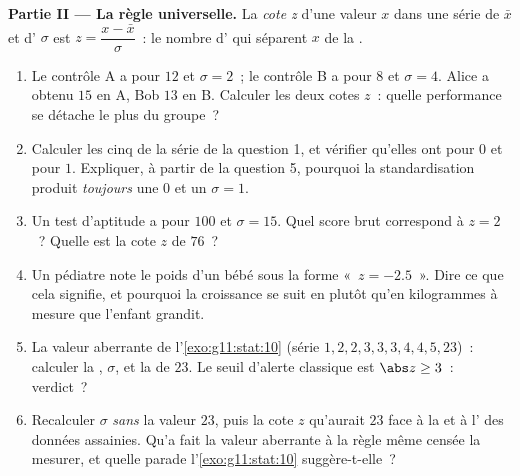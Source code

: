 \begin{problem}
\medskip
\noindent\textbf{Partie II --- La règle universelle.}
La \emph{cote z} d'une valeur $x$ dans une série de
 $\bar x$ et d' $\sigma$ est
$z = \dfrac{x - \bar x}{\sigma}$~: le nombre d' qui
séparent $x$ de la .
\begin{enumerate}[resume]
  \item Le contrôle A a pour  $12$ et $\sigma = 2$~; le
        contrôle B a pour  $8$ et $\sigma = 4$. Alice a
        obtenu $15$ en A, Bob $13$ en B. Calculer les deux cotes
        $z$~: quelle performance se détache le plus du groupe~?
  \item Calculer les cinq  de la série de la question 1, et
        vérifier qu'elles ont pour  $0$ et pour 
        $1$. Expliquer, à partir de la question 5, pourquoi la
        standardisation produit \emph{toujours} une  $0$ et
        un $\sigma = 1$.
  \item Un test d'aptitude a pour  $100$ et $\sigma = 15$.
        Quel score brut correspond à $z = 2$~? Quelle est la cote
        $z$ de $76$~?
  \item Un pédiatre note le poids d'un bébé sous la forme
        «~$z = -2.5$~». Dire ce que cela signifie, et pourquoi la
        croissance se suit en  plutôt qu'en kilogrammes à
        mesure que l'enfant grandit.
  \item La valeur aberrante de l'\cref{exo:g11:stat:10} (série
        $1, 2, 2, 3, 3, 3, 4, 4, 5, 23$)~: calculer la ,
        $\sigma$, et la  de $23$. Le seuil d'alerte
        classique est $\abs z \geq 3$~: verdict~?
  \item Recalculer $\sigma$ \emph{sans} la valeur $23$, puis la cote
        $z$ qu'aurait $23$ face à la  et à l' des
        données assainies. Qu'a fait la valeur aberrante à la règle
        même censée la mesurer, et quelle parade
        l'\cref{exo:g11:stat:10} suggère-t-elle~?
\end{enumerate}


\end{problem}
